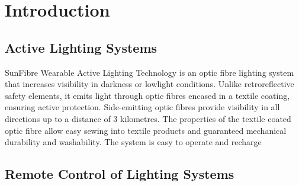 



\chapter{Introduction}
   
\section{Active Lighting Systems}
   
     
     SunFibre Wearable Active Lighting Technology is an optic fibre lighting system that increases visibility in darkness or lowlight conditions. Unlike retroreflective safety elements, it emits light through optic fibres encased in a textile coating, ensuring active protection. Side-emitting optic fibres provide visibility in all directions up to a distance of 3 kilometres. The properties of the textile coated optic fibre allow easy sewing into textile products and guaranteed mechanical durability and washability. The system is easy to operate and recharge
     
     
     \todo{}
    

\section{Remote Control of Lighting Systems}
    
  